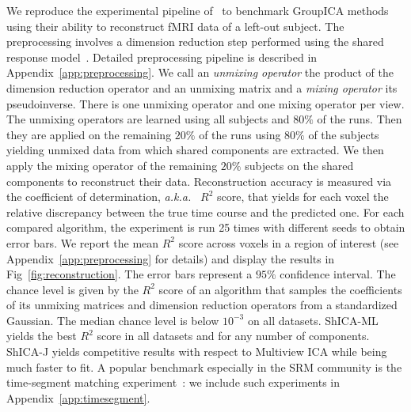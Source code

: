 \documentclass[12pt]{report}
\newcommand{\aka}{{\em a.k.a.~}}
\begin{document}
We reproduce the experimental pipeline of~\cite{richard2020modeling} to benchmark GroupICA methods using their ability to reconstruct fMRI data of a left-out subject.
%
The preprocessing involves a dimension reduction step performed using the shared response model~\cite{chen2015reduced}. Detailed preprocessing pipeline is described in Appendix~\ref{app:preprocessing}. We call an \emph{unmixing operator} the product of the dimension
reduction operator and an unmixing matrix and a \emph{mixing operator} its pseudoinverse. There is one unmixing operator and one mixing operator per view.
The unmixing operators are learned using all subjects
and $80\%$ of the runs. Then they are applied on the remaining $20\%$ of the runs using $80\%$
of the subjects yielding unmixed data from which shared components are extracted. We
then apply the mixing operator of the remaining $20\%$ subjects on the shared components to reconstruct their data.
%
Reconstruction accuracy is measured via the coefficient of determination, \aka
$R^2$ score, that
yields for each voxel the relative discrepancy between the true time course and the predicted one.
%
For each compared algorithm, the experiment is run 25 times with different seeds to obtain error bars. We report the mean $R^2$ score across voxels in a region of interest (see Appendix~\ref{app:preprocessing} for details)
 and display the results in Fig~\ref{fig:reconstruction}. The error bars represent a $95\%$ confidence interval.
The chance level is given by the $R^2$ score of an algorithm that samples the coefficients of its unmixing matrices and dimension reduction operators from a standardized Gaussian. The median chance level is below $10^{-3}$ on all datasets. 
ShICA-ML yields the best $R^2$ score in all datasets and for any number of components. ShICA-J yields competitive results with respect to Multiview ICA while being much faster to fit. A popular benchmark especially in the SRM community is the time-segment matching experiment~\cite{chen2015reduced}: we include such experiments in Appendix~\ref{app:timesegment}.


% 
\end{document}
